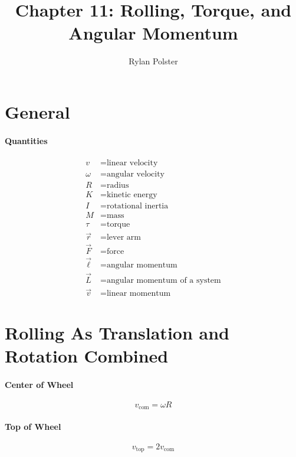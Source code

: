 \documentclass{article}
\title{Chapter 11: Rolling, Torque, and Angular Momentum}
\author{Rylan Polster}
\begin{document}
    \maketitle

    \section*{General}

        \paragraph{Quantities}
        \begin{align}
            v &= \text{linear velocity} \nonumber\\
            \omega &= \text{angular velocity} \nonumber\\
            R &= \text{radius} \nonumber\\
            K &= \text{kinetic energy} \nonumber\\
            I &= \text{rotational inertia} \nonumber\\
            M &= \text{mass} \nonumber\\
            \tau &= \text{torque} \nonumber\\
            \vec{r} &= \text{lever arm} \nonumber\\
            \vec{F} &= \text{force} \nonumber\\
            \vec{\ell} &= \text{angular momentum} \nonumber\\
            \vec{L} &= \text{angular momentum of a system} \nonumber\\
            \vec{v} &= \text{linear momentum} \nonumber
        \end{align}

    \section{Rolling As Translation and Rotation Combined}

        \paragraph{Center of Wheel}
        \begin{equation}
            v_\text{com} = \omega R
        \end{equation}

        \paragraph{Top of Wheel}
        \begin{equation}
            v_\text{top} = 2 v_\text{com}
        \end{equation}
\end{document}
